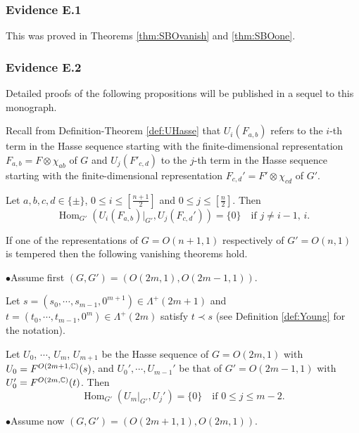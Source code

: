 \bigskip
\noindent
\subsubsection{Evidence  E.1}
This was proved in Theorems \ref{thm:SBOvanish} and \ref{thm:SBOone}.  

\bigskip
\noindent
\subsubsection{Evidence E.2} 
Detailed proofs of the following propositions  will be published in a sequel to this monograph. 


\medskip
Recall from Definition-Theorem \ref{def:UHasse}
 that $U_i(F_{a,b})$ refers to the $i$-th term in the Hasse sequence
 starting with the finite-dimensional representation 
 $F_{a,b}=F \otimes \chi_{a b}$ of $G$ 
 and $U_j(F'_{c,d})$ to the $j$-th term in the Hasse sequence starting
 with the finite-dimensional representation 
$
   F_{c,d}'=F' \otimes \chi_{c d}
$ of $G'$.  
\begin{proposition}
\label{conj:SBOvanish}
Let $a,b,c,d \in \{\pm\}$, 
 $0 \le i \le [\frac{n+1}{2}]$
 and $0 \le j \le [\frac{n}{2}]$.  
Then 
\[
{\operatorname{Hom}}_{G'}
 (U_i(F_{a,b})|_{G'}, U_j(F_{c,d}'))=\{ 0 \}
\quad
\text{if $j \not =i-1$, $i$}.  
\] 
\end{proposition}



\medskip 
If one of the representations of $G=O(n+1,1)$ respectively of $G'=O(n,1)$
 is tempered then the following vanishing theorems hold.  
 
 
\vskip 1pc
\noindent
$\bullet$\enspace Assume first 
$(G,G')=(O(2m,1),O(2m-1,1))$.  


Let $s=(s_0, \cdots, s_{m-1},0^{m+1}) \in \Lambda^+(2m+1)$
 and $t=(t_0, \cdots, t_{m-1},0^m) \in \Lambda^+(2m)$
 satisfy $t \prec s$
 (see Definition \ref{def:Young} for the notation).  


\begin{proposition}
\label{prop:171427}
Let $U_0$, $\cdots$, $U_m$, $U_{m+1}$ be the Hasse sequence of $G=O(2m,1)$
 with $U_0= F^{{O(2m+1,{\mathbb{C}})}}({s})$, 
 and $U_0', \cdots, U_{m-1}'$ be that of $G'=O(2m-1,1)$
 with $U_0'= F^{{O(2m,{\mathbb{C}})}}({t})$.  
Then 
\[
{\operatorname{Hom}}_{G'}
(U_m|_{G'}, U_j')=\{0\}
\quad
\text{if $0 \le j \le m-2$.}
\]
\end{proposition}



\vskip 1pc
\noindent
$\bullet$\enspace Assume now
$(G,G')=(O(2m+1,1),O(2m,1))$.  


